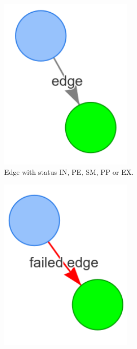 \begin{figure}[H]
    \begin{subfigure}{0.33\textwidth}
    \centering
    \includegraphics[width=0.7\textwidth]{figures/connecting_nodes/legend/edge}
    \caption{Edge with status IN, PE, SM, PP or EX.}%
    \end{subfigure}
    \begin{subfigure}{0.33\textwidth}
    \centering
    \includegraphics[width=0.7\textwidth]{figures/connecting_nodes/legend/failed_edge}

\end{subfigure}
\end{figure}
